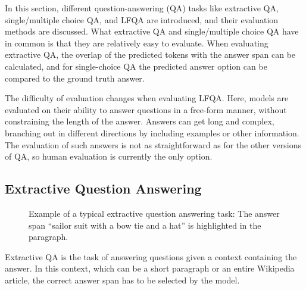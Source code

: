 In this section, different question-answering (QA) tasks like extractive QA, single/multiple choice QA, and LFQA are introduced, and their evaluation methods are discussed.
What extractive QA and single/multiple choice QA have in common is that they are relatively easy to evaluate.
When evaluating extractive QA, the overlap of the predicted tokens with the answer span can be calculated, and for single-choice QA the predicted answer option can be compared to the ground truth answer.

The difficulty of evaluation changes when evaluating LFQA.
Here, models are evaluated on their ability to answer questions in a free-form manner, without constraining the length of the answer.
Answers can get long and complex, branching out in different directions by including examples or other information.
The evaluation of such answers is not as straightforward as for the other versions of QA, so human evaluation is currently the only option.

\subsection{Extractive Question Answering}\label{sec:extractive-qa}
\begin{figure}[tb]
    \centering
    \caption{Example of a typical extractive question answering task: The answer span ``sailor suit with a bow tie and a hat'' is highlighted in the paragraph.}\label{fig:extractive_qa_example}
\end{figure}
Extractive QA is the task of answering questions given a context containing the answer.
In this context, which can be a short paragraph or an entire Wikipedia article, the correct answer span has to be selected by the model.

